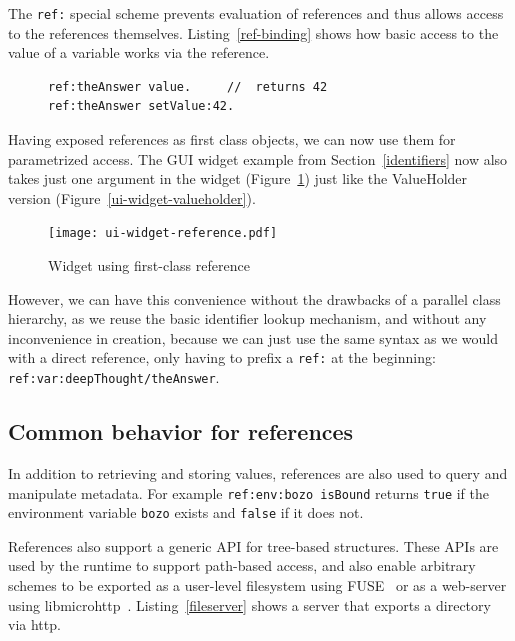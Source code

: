 \documentclass[preprint]{sigplanconf}
\begin{document}
The {\tt ref:} special scheme prevents evaluation of references and thus allows access
to the references themselves.  Listing~\ref{ref-binding} shows how basic access to
the value of a variable works via the reference.


\begin{figure}[htbp]
\begin{lstlisting}[style=numbers,label=ref-binding,caption=Retrieve and store value via its reference.]
ref:theAnswer value.     //  returns 42
ref:theAnswer setValue:42.  
\end{lstlisting}
\end{figure}

Having exposed references as first class objects, we can now use them for parametrized 
access.  The GUI widget example from Section~\ref{identifiers} now
also takes just one argument in the widget (Figure~\ref{ui-widget-reference}) just like
the ValueHolder version (Figure~\ref{ui-widget-valueholder}).

\begin{figure}[htbp]
\centering
\texttt{[image: ui-widget-reference.pdf]}
\caption{Widget using first-class reference}
\label{ui-widget-reference}

\end{figure}

However, we can have this convenience without the drawbacks of a parallel class
hierarchy, as we reuse the basic identifier lookup mechanism, and without any
inconvenience in creation, because we can just use the same syntax as we would
with a direct reference, only having to prefix a {\tt ref:} at the beginning:  {\tt ref:var:deepThought/theAnswer}.


\subsection{Common behavior for references}
\label{common-reference-behavior}
In addition to retrieving and storing values, references are also used to query and manipulate
metadata.  For example {\tt ref:env:bozo isBound} returns {\tt true} if the environment
variable {\tt bozo} exists and {\tt false} if it does not.

References also support a generic API for tree-based structures.   These APIs are used
by the runtime to support path-based access, and also enable arbitrary
schemes to be exported as a user-level filesystem using FUSE~\cite{fuse} or as a web-server using libmicrohttp~\cite{libmicrohttp}.
Listing~\ref{fileserver} shows a server that exports a directory via http.
\end{document}
